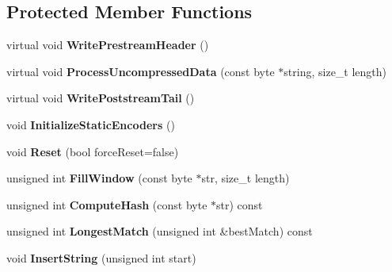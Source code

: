 \subsection*{Protected Member Functions}
\begin{DoxyCompactItemize}
\item 
\hypertarget{class_deflator_a4d36fef18ebdbd5827fcb41ab4d8203a}{
virtual void {\bfseries WritePrestreamHeader} ()}
\label{class_deflator_a4d36fef18ebdbd5827fcb41ab4d8203a}

\item 
\hypertarget{class_deflator_af28ffbe1568d6b2b8d7f943eef0529e1}{
virtual void {\bfseries ProcessUncompressedData} (const byte $\ast$string, size\_\-t length)}
\label{class_deflator_af28ffbe1568d6b2b8d7f943eef0529e1}

\item 
\hypertarget{class_deflator_aba9b58b31fac7828e98d4e4d15972f17}{
virtual void {\bfseries WritePoststreamTail} ()}
\label{class_deflator_aba9b58b31fac7828e98d4e4d15972f17}

\item 
\hypertarget{class_deflator_af443cc93b1d40e7226d7b4002e2f3f5a}{
void {\bfseries InitializeStaticEncoders} ()}
\label{class_deflator_af443cc93b1d40e7226d7b4002e2f3f5a}

\item 
\hypertarget{class_deflator_a7976eb754f823f093846a3ba3c0733d7}{
void {\bfseries Reset} (bool forceReset=false)}
\label{class_deflator_a7976eb754f823f093846a3ba3c0733d7}

\item 
\hypertarget{class_deflator_aa041fc5f5426862e45b164fdceba84db}{
unsigned int {\bfseries FillWindow} (const byte $\ast$str, size\_\-t length)}
\label{class_deflator_aa041fc5f5426862e45b164fdceba84db}

\item 
\hypertarget{class_deflator_a44c260b1a4ac0fa54e5e80c4df0ff121}{
unsigned int {\bfseries ComputeHash} (const byte $\ast$str) const }
\label{class_deflator_a44c260b1a4ac0fa54e5e80c4df0ff121}

\item 
\hypertarget{class_deflator_af39e464efb6676829a3b9f3ea0c5f19c}{
unsigned int {\bfseries LongestMatch} (unsigned int \&bestMatch) const }
\label{class_deflator_af39e464efb6676829a3b9f3ea0c5f19c}

\item 
\hypertarget{class_deflator_aded37de66827ee6def1d3bb5a7c19315}{
void {\bfseries InsertString} (unsigned int start)}
\label{class_deflator_aded37de66827ee6def1d3bb5a7c19315}


\end{DoxyCompactItemize}
